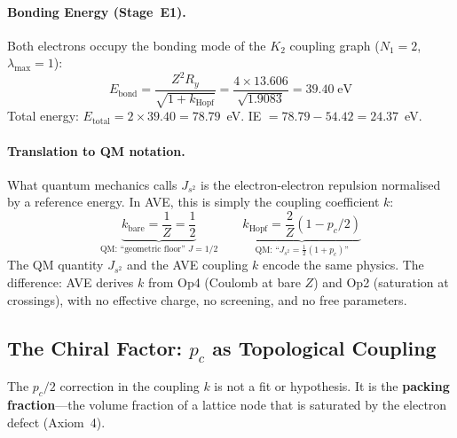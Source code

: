 \paragraph{Bonding Energy (Stage~E1).}
Both electrons occupy the bonding mode of the
$K_2$ coupling graph ($N_1 = 2$, $\lambda_{\max} = 1$):
\begin{equation}
    E_{\text{bond}} = \frac{Z^2 R_y}{\sqrt{1 + k_{\text{Hopf}}}}
    = \frac{4 \times 13.606}{\sqrt{1.9083}}
    = 39.40\;\text{eV}
\end{equation}
Total energy: $E_{\text{total}} = 2 \times 39.40 = 78.79$~eV.
IE $= 78.79 - 54.42 = 24.37$~eV.\;\checkmark

\paragraph{Translation to QM notation.}
What quantum mechanics calls $J_{s^2}$ is the electron-electron
repulsion normalised by a reference energy.  In AVE, this
is simply the coupling coefficient $k$:
\begin{equation}
    \underbrace{k_{\text{bare}} = \frac{1}{Z} = \frac{1}{2}}_{\text{QM:
    ``geometric floor'' $J = 1/2$}}
    \qquad
    \underbrace{k_{\text{Hopf}} = \frac{2}{Z}(1 - p_c/2)}_{\text{QM:
    ``$J_{s^2} = \tfrac{1}{2}(1 + p_c)$''}}
\end{equation}
The QM quantity $J_{s^2}$ and the AVE coupling $k$ encode
the same physics.  The difference: AVE derives $k$ from
Op4 (Coulomb at bare $Z$) and Op2 (saturation at crossings),
with no effective charge, no screening, and no free parameters.

\subsection{The Chiral Factor: $p_c$ as Topological Coupling}
\label{sec:chiral_factor}

The $p_c/2$ correction in the coupling $k$
is not a fit or hypothesis.  It is the \textbf{packing
fraction}---the volume fraction of a lattice node that is
saturated by the electron defect (Axiom~4).

